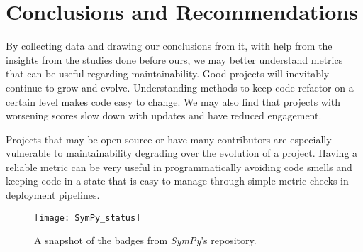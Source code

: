 \chapter{Conclusions and Recommendations} \label{chapterConclusion}



By collecting data and drawing our conclusions from it, with help from the insights from the studies done before ours, we may better understand metrics that can be useful regarding maintainability. Good projects will inevitably continue to grow and evolve. Understanding methods to keep code refactor on a certain level makes code easy to change. We may also find that projects with worsening scores slow down with updates and have reduced engagement.


Projects that may be open source or have many contributors are especially vulnerable to maintainability degrading over the evolution of a project. Having a reliable metric can be very useful in programmatically avoiding code smells and keeping code in a state that is easy to manage through simple metric checks in deployment pipelines.


\begin{figure}[ht]
    \centerline{
        \texttt{[image: SymPy\_status]}
    }
    \caption{A snapshot of the badges from \emph{SymPy}'s repository.}
    \label{figSymPyStatus}
\end{figure}

